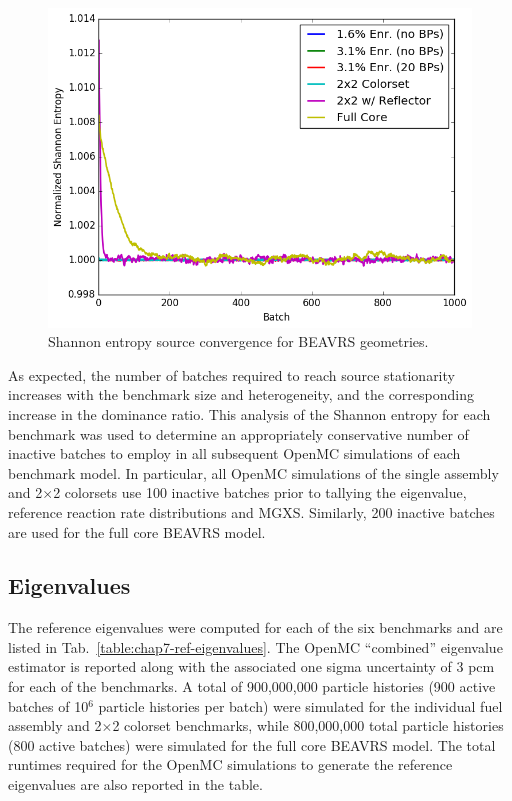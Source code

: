 \begin{figure}[h!]
  \centering
  \includegraphics[width=0.9\linewidth]{figures/benchmarks/entropy/entropy-all}
\caption[Shannon entropy source convergence for BEAVRS geometries]{Shannon entropy source convergence for BEAVRS geometries.}
\label{fig:chap7-entropy}
\end{figure}

As expected, the number of batches required to reach source stationarity increases with the benchmark size and heterogeneity, and the corresponding increase in the dominance ratio. This analysis of the Shannon entropy for each benchmark was used to determine an appropriately conservative number of inactive batches to employ in all subsequent OpenMC simulations of each benchmark model. In particular, all OpenMC simulations of the single assembly and 2$\times$2 colorsets use 100 inactive batches prior to tallying the eigenvalue, reference reaction rate distributions and \ac{MGXS}. Similarly, 200 inactive batches are used for the full core \ac{BEAVRS} model.

\subsection{Eigenvalues}
\label{subsec:chap7-eigenvalues}

The reference eigenvalues were computed for each of the six benchmarks and are listed in Tab.~\ref{table:chap7-ref-eigenvalues}. The OpenMC ``combined'' eigenvalue estimator is reported along with the associated one sigma uncertainty of 3 \ac{pcm} for each of the benchmarks. A total of 900,000,000 particle histories (900 active batches of 10$^6$ particle histories per batch) were simulated for the individual fuel assembly and 2$\times$2 colorset benchmarks, while 800,000,000 total particle histories (800 active batches) were simulated for the full core \ac{BEAVRS} model. The total runtimes required for the OpenMC simulations to generate the reference eigenvalues are also reported in the table. 


